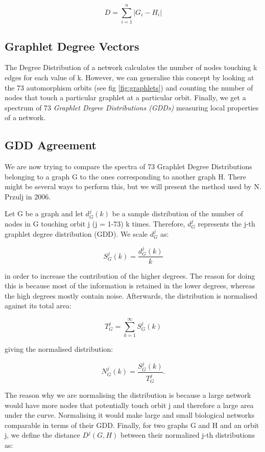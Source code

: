 \begin{equation}
 D = \sum_{i=1}^{n}| G_i - H_i |
\end{equation}


\subsection{Graphlet Degree Vectors}

The Degree Distribution of a network calculates the number of nodes touching k
edges for each value of k. However, we can generalise this concept by looking
at the 73 automorphism orbits (see fig \ref{fig:graphlets}) and counting the
number of nodes that touch a particular graphlet at a particular orbit. Finally,
we get a spectrum of 73 \emph{Graphlet Degree Distributions (GDDs)} measuring
local properties of a network. 


\subsection{GDD Agreement}

We are now trying to compare the spectra of 73 Graphlet Degree Distributions
belonging to a graph G to the ones corresponding to another graph H. There
might be several ways to perform this, but we will present the method used by
N. Przulj in 2006\cite{prvzulj2007biological}. 

Let G be a graph and let \( d_G^j(k) \) be a sample distribution of the
number of nodes in G touching orbit j (j = 1-73) k times. Therefore, \( d_G^j
\) represents the j-th graphlet degree distribution (GDD). We scale \( d_G^j
\) as:

$$ S_G^j(k) = \frac{d_G^j(k)}{k} $$

in order to increase the contribution of the higher degrees. The reason for 
doing this is because most of the information is retained in the lower
degrees, whereas the high degrees mostly contain
noise\cite{prvzulj2007biological}. Afterwards, the distribution is normalised
against its total area:

$$ T_G^j = \sum_{k=1}^{\infty}S_G^j(k) $$

giving the normalised distribution:

$$ N_G^j(k) = \frac{S_G^j(k)}{T_G^j}. $$

The reason why we are normalising the distribution is because a large
network would have more nodes that potentially touch orbit j and therefore a
large area under the curve. Normalising it would make large and small
biological networks comparable in terms of their GDD. Finally, for two graphs G
and H and an orbit j, we define the distance \( D^j(G,H) \) between their
normalized j-th distributions as:

